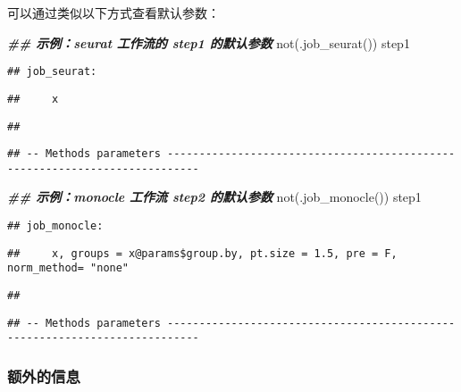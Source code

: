 \documentclass[
]{article}
\newenvironment{Shaded}{\begin{snugshade}}{\end{snugshade}}
\newcommand{\DocumentationTok}[1]{\textcolor[rgb]{0.56,0.35,0.01}{\textbf{\textit{#1}}}}
\newcommand{\FunctionTok}[1]{\textcolor[rgb]{0.00,0.00,0.00}{#1}}
\newcommand{\NormalTok}[1]{#1}
\begin{document}
可以通过类似以下方式查看默认参数：

\begin{Shaded}
\begin{Highlighting}[]
\DocumentationTok{\#\# 示例：seurat 工作流的 step1 的默认参数}
\FunctionTok{not}\NormalTok{(}\FunctionTok{.job\_seurat}\NormalTok{())}
\NormalTok{step1}
\end{Highlighting}
\end{Shaded}

\begin{verbatim}
## job_seurat:
\end{verbatim}

\begin{verbatim}
##     x
\end{verbatim}

\begin{verbatim}
## 
\end{verbatim}

\begin{verbatim}
## -- Methods parameters ---------------------------------------------------------------------------
\end{verbatim}

\begin{Shaded}
\begin{Highlighting}[]
\DocumentationTok{\#\# 示例：monocle 工作流 step2 的默认参数}
\FunctionTok{not}\NormalTok{(}\FunctionTok{.job\_monocle}\NormalTok{())}
\NormalTok{step1}
\end{Highlighting}
\end{Shaded}

\begin{verbatim}
## job_monocle:
\end{verbatim}

\begin{verbatim}
##     x, groups = x@params$group.by, pt.size = 1.5, pre = F, norm_method= "none"
\end{verbatim}

\begin{verbatim}
## 
\end{verbatim}

\begin{verbatim}
## -- Methods parameters ---------------------------------------------------------------------------
\end{verbatim}

\hypertarget{ux989dux5916ux7684ux4fe1ux606f}{%
\subsubsection{额外的信息}\label{ux989dux5916ux7684ux4fe1ux606f}}
\end{document}
